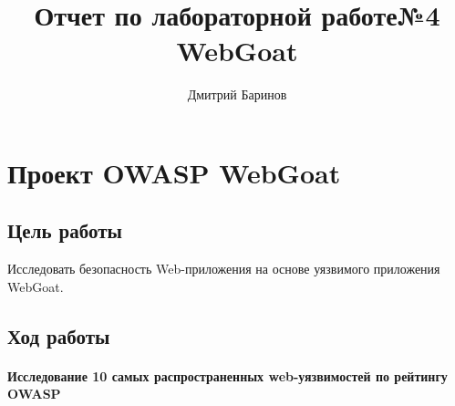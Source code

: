 \documentclass[10pt,a4paper]{article}
\author{Дмитрий Баринов}
\title{Отчет по лабораторной работе№4 WebGoat}
\begin{document}
\maketitle
\newpage

\section{Проект OWASP WebGoat}

\subsection{Цель работы}

Исследовать безопасность Web-приложения на основе уязвимого приложения WebGoat.

\subsection{Ход работы}

\paragraph{Исследование 10 самых распространенных web-уязвимостей по рейтингу OWASP} 
\end{document}
